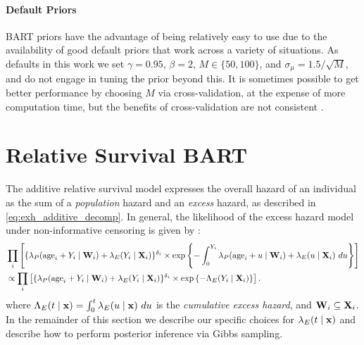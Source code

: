 \documentclass[12pt]{article}
\newcommand{\bfW}{{\bf W}}
\newcommand{\bfX}{{\bf X}}
\newcommand{\bfx}{{\bf x}}
\newcommand{\bfw}{{\bf w}}
\begin{document}
\paragraph{Default Priors}
BART priors have the advantage of being relatively easy to use due to the availability of good default priors that work across a variety of situations. As defaults in this work we set $\gamma = 0.95$, $\beta = 2$, $M \in \{50, 100\}$, and $\sigma_\mu = 1.5 / \sqrt M$, and do not engage in tuning the prior beyond this. It is sometimes possible to get better performance by choosing $M$ via cross-validation, at the expense of more computation time, but the benefits of cross-validation are not consistent \citep{chipman2010bart, linero2017abayesian}.


\section{Relative Survival BART}\label{sec:relsurv_BART}
 

{The additive relative survival model expresses the overall hazard of an individual as the sum of a \emph{population} hazard and an \emph{excess} hazard, as described in \eqref{eq:exh_additive_decomp}.}
In general, the likelihood of the excess hazard model under non-informative censoring is given by \citep{rubio:2019}:
\begin{align*}
    &\prod_i \left[\{\lambda_P(\text{age}_i + Y_i \mid \bfW_i) + \lambda_E(Y_i \mid \bfX_i)\}^{\delta_i} 
    \times \exp\left\{- \int_0^{Y_i} \lambda_P(\text{age}_i + u \mid \bfW_i) + \lambda_E(u \mid \bfX_i) \ du\right\}\right]
    \\&\propto \prod_i \left[\{\lambda_P(\text{age}_i + Y_i \mid \bfW_i) + \lambda_E(Y_i \mid \bfX_i)\}^{\delta_i} 
    \times \exp\left\{- \Lambda_E(Y_i \mid \bfX_i) \right\}\right].
\end{align*}
where $\Lambda_E(t \mid \bfx) = \int_0^t \lambda_E(u \mid \bfx) \ du$ is the \emph{cumulative excess hazard}, and $\bfW_i \subseteq \bfX_i$.
In the remainder of this section we describe our specific choices for $\lambda_E(t \mid \bfx)$ and describe how to perform posterior inference via Gibbs sampling.
\end{document}

